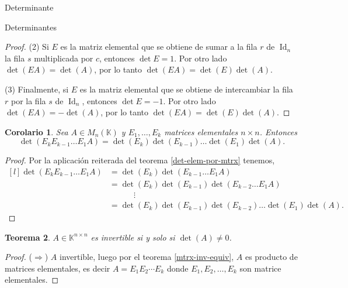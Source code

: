 \documentclass[a4paper,12pt,twoside,spanish,reqno]{amsbook}
\newtheorem{teorema}{Teorema}[section]
\newtheorem{corolario}[teorema]{Corolario}
\theoremstyle{definition}
\theoremstyle{remark}
\newcommand{\Id}{\operatorname{Id}}
\newcommand{\K}{\mathbb K}
\begin{document}
\begin{chapter}{Determinante}
\begin{section}{Determinantes}
\begin{proof}
             
             (2) Si $E$ es la matriz elemental que se obtiene de sumar a la fila $r$ de $\Id_n$  la fila $s$ multiplicada por $c$, entonces $\det E =1$. Por  otro lado  $\det(EA) = \det(A)$, por lo tanto  $\det(EA) = \det(E)\det(A)$.
             
             (3) Finalmente, si $E$ es la matriz elemental que se obtiene de intercambiar la fila $r$ por la fila $s$ de $\Id_n$, entonces $\det E=-1$. Por  otro lado  $\det(EA) = -\det(A)$, por lo tanto  $\det(EA) = \det(E)\det(A)$.
         \end{proof}
         
         \begin{corolario}\label{coro-det-prod-elem-mtrx}
             Sea $A  \in M_n(\K)$ y $E_1,\ldots,E_k$ matrices elementales $n \times n$. Entonces
             \begin{equation*}
             \det (E_kE_{k-1}\ldots E_1A) = \det (E_k) \det (E_{k-1})\ldots \det (E_1) \det (A).
             \end{equation*}  
         \end{corolario}
         \begin{proof}
             Por  la aplicación reiterada del teorema \ref{det-elem-por-mtrx} tenemos, 
             \begin{equation*}
             \begin{matrix*}[l]
             \det (E_kE_{k-1}\ldots E_1A) &= \det (E_k) \det(E_{k-1}\ldots E_1 A) \\
             &= \det( E_k) \det(E_{k-1})\det(E_{k-2}\ldots E_1A) \\
             &\qquad\quad \vdots \\
             & = \det( E_k) \det(E_{k-1})\det(E_{k-2})\ldots \det(E_1) \det(A).
             \end{matrix*}		
             \end{equation*}
         \end{proof}
         


         \begin{teorema}\label{th-det-matriz-invertible}
            $A \in \K^{n \times n}$ es invertible si y solo si $\det(A) \ne 0$.
        \end{teorema}
        \begin{proof}
            ($\Rightarrow$)  $A$ invertible, luego por el  teorema \ref{mtrx-inv-equiv}, $A$ es producto de matrices elementales, es decir  $A = E_1 E_2 \cdots E_k$  donde $E_1, E_2, \ldots, E_k$ son matrice elementales. 
            

\end{proof}
\end{section}
\end{chapter}
\end{document}
